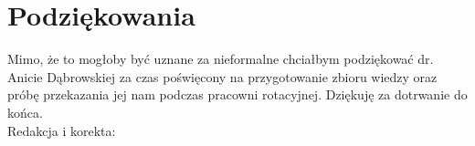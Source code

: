 \documentclass[11pt, a4paper, fleqn]{article}
\begin{document}
\section{Podziękowania}
    Mimo, że to mogłoby być uznane za nieformalne chciałbym podziękować dr. Anicie Dąbrowskiej za czas poświęcony
    na przygotowanie zbioru wiedzy oraz próbę przekazania jej nam podczas pracowni rotacyjnej. Dziękuję za dotrwanie do końca.
    \\Redakcja i korekta: 
\end{document}
